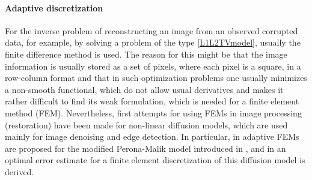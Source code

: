 \documentclass[enabledeprecatedfontcommands,cleardoublepage=empty,headsepline,twoside,11pt,DIV=15,BCOR=12mm,final]{scrartcl}
\begin{document}


\paragraph{Adaptive discretization}
For the inverse problem of reconstructing an image from an observed corrupted data, for example, by solving a problem of the type \eqref{L1L2TVmodel}, usually the finite difference method is used. The reason for this might be that the image information is usually stored as a set of pixels, where each pixel is a square, in a row-column format and that in such optimization problems one usually minimizes a non-smooth functional, which do not allow usual derivatives and makes it rather difficult to find its weak formulation, which is needed for a finite element method (FEM). Nevertheless, first attempts for using FEMs in image processing (restoration) have been made for non-linear diffusion models, which are used mainly for image denoising and edge detection. In particular, in \cite{BazanBlomgren:05, BanschMikula:97, PreuerRumpf:00} adaptive FEMs are proposed for the modified Perona-Malik model introduced in \cite{CaLiMoCo:92}, and in \cite{Li:02} an optimal error estimate for a finite element discretization of this diffusion model is derived.
\end{document}
